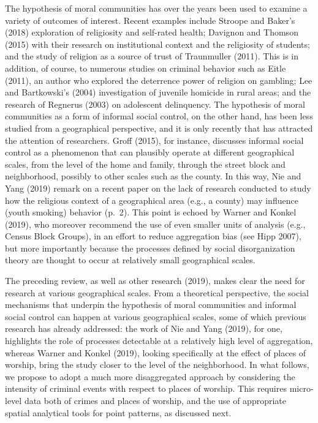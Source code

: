 \documentclass[smallextended]{svjour3}       %
\begin{document}
The hypothesis of moral communities has over the years been used to
examine a variety of outcomes of interest. Recent examples include
Stroope and Baker's (2018) exploration of religiosity and self-rated
health; Davignon and Thomson (2015) with their research on institutional
context and the religiosity of students; and the study of religion as a
source of trust of Traunmuller (2011). This is in addition, of course,
to numerous studies on criminal behavior such as Eitle (2011), an author
who explored the deterrence power of religion on gambling; Lee and
Bartkowski's (2004) investigation of juvenile homicide in rural areas;
and the research of Regnerus (2003) on adolescent delinquency. The
hypothesis of moral communities as a form of informal social control, on
the other hand, has been less studied from a geographical perspective,
and it is only recently that has attracted the attention of researchers.
Groff (2015), for instance, discusses informal social control as a
phenomenon that can plausibly operate at different geographical scales,
from the level of the home and family, through the street block and
neighborhood, possibly to other scales such as the county. In this way,
Nie and Yang (2019) remark on a recent paper on the lack of research
conducted to study how the religious context of a geographical area
(e.g., a county) may influence (youth smoking) behavior (p.~2). This
point is echoed by Warner and Konkel (2019), who moreover recommend the
use of even smaller units of analysis (e.g., Census Block Groups), in an
effort to reduce aggregation bias (see Hipp 2007), but more importantly
because the processes defined by social disorganization theory are
thought to occur at relatively small geographical scales.

The preceding review, as well as other research (2019), makes clear the
need for research at various geographical scales. From a theoretical
perspective, the social mechanisms that underpin the hypothesis of moral
communities and informal social control can happen at various
geographical scales, some of which previous research has already
addressed: the work of Nie and Yang (2019), for one, highlights the role
of processes detectable at a relatively high level of aggregation,
whereas Warner and Konkel (2019), looking specifically at the effect of
places of worship, bring the study closer to the level of the
neighborhood. In what follows, we propose to adopt a much more
disaggregated approach by considering the intensity of criminal events
with respect to places of worship. This requires micro-level data both
of crimes and places of worship, and the use of appropriate spatial
analytical tools for point patterns, as discussed next.
\end{document}
